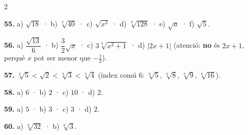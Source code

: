 \documentclass[13pt,a4paper]{extarticle}
\begin{document}
\begin{multicols}{2}
\par\noindent\begin{minipage}{\linewidth}
\textbf{55.} a) $\sqrt{18}$ · b) $\sqrt[3]{40}$ · c) $\sqrt{x^3}$ · d) $\sqrt[3]{128}$ · e) $\sqrt{a}$ · f) $\sqrt5$.\par
\end{minipage}\par\vspace{1.6mm}
\par\noindent\begin{minipage}{\linewidth}
\textbf{56.} a) $\dfrac{\sqrt{13}}{6}$ · b) $\dfrac{3}{2}\sqrt{x}$ · c) $3\sqrt[3]{x^2+1}$ · d) $|2x+1|$ (atenció: \textbf{no} és $2x+1$, perquè $x$ pot ser menor que $-\tfrac12$).\par
\end{minipage}\par\vspace{1.6mm}
\par\noindent\begin{minipage}{\linewidth}
\textbf{57.} $\sqrt[6]{5}<\sqrt2<\sqrt[3]{3}<\sqrt[3]{4}$ (índex comú $6$: $\sqrt[6]{5}$, $\sqrt[6]{8}$, $\sqrt[6]{9}$, $\sqrt[6]{16}$).\par
\end{minipage}\par\vspace{1.6mm}
\par\noindent\begin{minipage}{\linewidth}
\textbf{58.} a) $6$ · b) $2$ · c) $10$ · d) $2$.\par
\end{minipage}\par\vspace{1.6mm}
\par\noindent\begin{minipage}{\linewidth}
\textbf{59.} a) $5$ · b) $3$ · c) $3$ · d) $2$.\par
\end{minipage}\par\vspace{1.6mm}
\par\noindent\begin{minipage}{\linewidth}
\textbf{60.} a) $\sqrt[6]{32}$ · b) $\sqrt[6]{3}$.\par
\end{minipage}\par\vspace{1.6mm}
\par\noindent\begin{minipage}{\linewidth}

\end{minipage}
\end{multicols}
\end{document}
